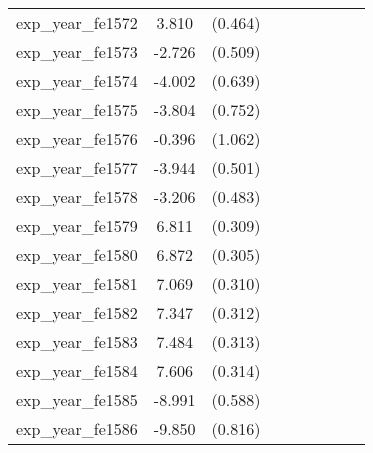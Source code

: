 {\begin{tabular}{l*{4}{cc}}
exp\_year\_fe1572&    3.810\sym{***}&  (0.464)&                  &         &                  &         &                  &         \\
exp\_year\_fe1573&   -2.726\sym{***}&  (0.509)&                  &         &                  &         &                  &         \\
exp\_year\_fe1574&   -4.002\sym{***}&  (0.639)&                  &         &                  &         &                  &         \\
exp\_year\_fe1575&   -3.804\sym{***}&  (0.752)&                  &         &                  &         &                  &         \\
exp\_year\_fe1576&   -0.396         &  (1.062)&                  &         &                  &         &                  &         \\
exp\_year\_fe1577&   -3.944\sym{***}&  (0.501)&                  &         &                  &         &                  &         \\
exp\_year\_fe1578&   -3.206\sym{***}&  (0.483)&                  &         &                  &         &                  &         \\
exp\_year\_fe1579&    6.811\sym{***}&  (0.309)&                  &         &                  &         &                  &         \\
exp\_year\_fe1580&    6.872\sym{***}&  (0.305)&                  &         &                  &         &                  &         \\
exp\_year\_fe1581&    7.069\sym{***}&  (0.310)&                  &         &                  &         &                  &         \\
exp\_year\_fe1582&    7.347\sym{***}&  (0.312)&                  &         &                  &         &                  &         \\
exp\_year\_fe1583&    7.484\sym{***}&  (0.313)&                  &         &                  &         &                  &         \\
exp\_year\_fe1584&    7.606\sym{***}&  (0.314)&                  &         &                  &         &                  &         \\
exp\_year\_fe1585&   -8.991\sym{***}&  (0.588)&                  &         &                  &         &                  &         \\
exp\_year\_fe1586&   -9.850\sym{***}&  (0.816)&                  &         &                  &         &                  &         \\

\end{tabular}}
